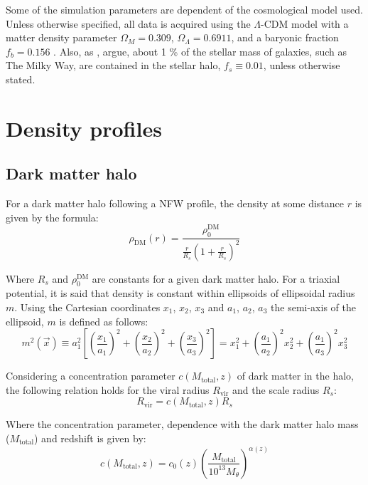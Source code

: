 	Some of the simulation parameters are dependent of the cosmological model used. Unless otherwise specified, all data is acquired using the $\Lambda$-CDM model with a matter density parameter $\Omega_M = 0.309$, $\Omega_\Lambda = 0.6911$, and a baryonic fraction $f_b = 0.156$ \cite{choksi2017recoiling}. Also, as \citeauthor{binney2011galactic}, argue, about 1 \% of the stellar mass of galaxies, such as The Milky Way, are contained in the stellar halo, $f_s \equiv 0.01$, unless otherwise stated.
	
	\section{Density profiles}
		\subsection{Dark matter halo}
			For a dark matter halo following a NFW profile, the density at some distance $r$ is given by the formula:
			\begin{equation}\label{eq: dmdensity}
				\rho_\text{DM}(r) = \dfrac{\rho_0^\text{DM}}{\frac{r}{R_s}\left(1 + \frac{r}{R_s}\right)^2}
			\end{equation}
			
			Where $R_s$ and $\rho_0^\text{DM}$ are constants for a given dark matter halo. For a triaxial potential, it is said that density is constant within ellipsoids of ellipsoidal radius $m$. Using the Cartesian coordinates $x_1$, $x_2$, $x_3$ and $a_1$, $a_2$, $a_3$ the semi-axis of the ellipsoid, $m$ is defined as follows:
			\begin{equation}
				m^2(\vec{x}) \equiv a_1^2\left[\left(\dfrac{x_1}{a_1}\right)^2 + \left(\dfrac{x_2}{a_2}\right)^2 + \left(\dfrac{x_3}{a_3}\right)^2\right] = x_1^2 + \left(\dfrac{a_1}{a_2}\right)^2x_2^2 + \left(\dfrac{a_1}{a_3}\right)^2x_3^2
			\end{equation}
			
			Considering a concentration parameter $c(M_\text{total}, z)$ of dark matter in the halo, the following relation holds for the viral radius $R_\text{vir}$ and the scale radius $R_s$:
			\begin{equation}\label{eq: virialConcentration}
				R_\text{vir} = c(M_\text{total}, z)R_s
			\end{equation}
			
			Where the concentration parameter, dependence with the dark matter halo mass ($M_\text{total}$) and redshift is given by: 
			\begin{equation}
			c(M_\text{total}, z) = c_0(z)\left(\dfrac{M_\text{total}}{10^{13}M_\theta}\right)^{\alpha(z)}
			\end{equation}
			
